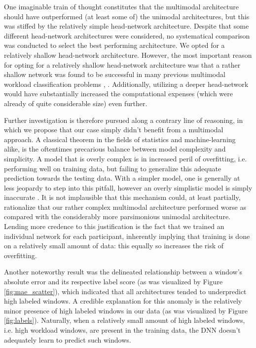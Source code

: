 \documentclass[12pt]{article}
\begin{document}
One imaginable train of thought constitutes that the multimodal architecture should have outperformed (at least some of) the unimodal architectures, but this was stiffed by the relatively simple head-network architecture. Despite that some different head-network architectures were considered, no systematical comparison was conducted to select the best performing architecture. We opted for a relatively shallow head-network architecture.  However, the most important reason for opting for a relatively shallow head-network architecture was that a rather shallow network was found to be successful in many previous multimodal workload classification problems \cite{yin2017recognition}, \cite{han2020classification} \cite{rastgoo2019automatic}. Additionally, utilizing a deeper head-network would have substantially increased the computational expenses (which were already of quite considerable size) even further.

Further investigation is therefore pursued along a contrary line of reasoning, in which we propose that our case simply didn't benefit from a multimodal approach.  A classical theorem in the fields of statistics and machine-learning alike, is the oftentimes precarious balance between model complexity and simplicity. A model that is overly complex is in increased peril of overfitting, i.e. performing well on training data, but failing to generalize this adequate prediction towards the testing data.  With a simpler model, one is generally at less jeopardy to step into this pitfall, however an overly simplistic model is simply inaccurate \cite{lever2016points}. It is not implausible that this mechanism could, at least partially, rationalize that our rather complex multimodal architecture performed worse as compared with the considerably more parsimonious unimodal architecture. Lending more credence to this justification is the fact that we trained an individual network for each participant, inherently implying that training is done on a relatively small amount of data: this equally so increases the risk of overfitting. 

Another noteworthy result was the delineated relationship between a window's absolute error and its respective label score (as was visualized by Figure \ref{fig:mae_scatter}), which indicated that all architectures tended to underpredict high labeled windows.  A credible explanation for this anomaly is the relatively minor presence of high labeled windows in our data (as was visualized by Figure \ref{fig:labels}). Naturally, when a relatively small amount of high labeled windows, i.e. high workload windows, are present in the training data, the DNN doesn't adequately learn to predict such windows. 
\end{document}
